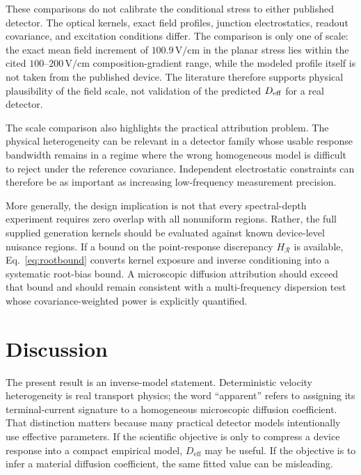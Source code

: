 \documentclass[aps,pra,twocolumn,superscriptaddress,nofootinbib]{revtex4-2}
\newcommand{\Deff}{D_{\mathrm{eff}}}
\newcommand{\Rregion}{\mathcal{R}}
\begin{document}
These comparisons do not calibrate the conditional stress to either published detector. The optical kernels, exact field profiles, junction electrostatics, readout covariance, and excitation conditions differ.  The comparison is only one of scale: the exact mean field increment of $100.9\,\mathrm{V/cm}$ in the planar stress lies within the cited $100$--$200\,\mathrm{V/cm}$ composition-gradient range, while the modeled profile itself is not taken from the published device.  The literature therefore supports physical plausibility of the field scale, not validation of the predicted $D_{\rm eff}$ for a real detector.

The scale comparison also highlights the practical attribution problem. The physical heterogeneity can be relevant in a detector family whose usable response bandwidth remains in a regime where the wrong homogeneous model is difficult to reject under the reference covariance. Independent electrostatic constraints can therefore be as important as increasing low-frequency measurement precision.

More generally, the design implication is not that every spectral-depth experiment requires zero overlap with all nonuniform regions. Rather, the full supplied generation kernels should be evaluated against known device-level nuisance regions. If a bound on the point-response discrepancy $H_{\Rregion}$ is available, Eq.~\eqref{eq:rootbound} converts kernel exposure and inverse conditioning into a systematic root-bias bound. A microscopic diffusion attribution should exceed that bound and should remain consistent with a multi-frequency dispersion test whose covariance-weighted power is explicitly quantified.

\section{Discussion}

The present result is an inverse-model statement. Deterministic velocity heterogeneity is real transport physics; the word ``apparent'' refers to assigning its terminal-current signature to a homogeneous microscopic diffusion coefficient. That distinction matters because many practical detector models intentionally use effective parameters. If the scientific objective is only to compress a device response into a compact empirical model, $\Deff$ may be useful. If the objective is to infer a material diffusion coefficient, the same fitted value can be misleading.
\end{document}
